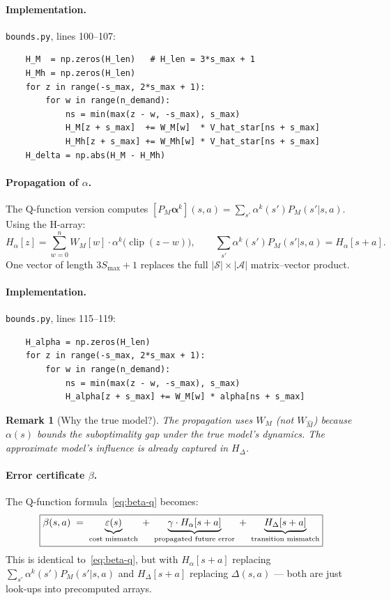\documentclass[11pt]{article}
\newcommand{\Smax}{S_{\max}}
\newcommand{\clip}{\operatorname{clip}}
\newtheorem{remark}{Remark}
\begin{document}
\paragraph{Implementation.}
\texttt{bounds.py}, lines 100--107:
\begin{verbatim}
    H_M  = np.zeros(H_len)   # H_len = 3*s_max + 1
    H_Mh = np.zeros(H_len)
    for z in range(-s_max, 2*s_max + 1):
        for w in range(n_demand):
            ns = min(max(z - w, -s_max), s_max)
            H_M[z + s_max]  += W_M[w]  * V_hat_star[ns + s_max]
            H_Mh[z + s_max] += W_Mh[w] * V_hat_star[ns + s_max]
    H_delta = np.abs(H_M - H_Mh)
\end{verbatim}

\paragraph{Propagation of $\alpha$.}
The Q-function version computes $[P_M \boldsymbol{\alpha}^k](s,a) = \sum_{s'}
\alpha^k(s') P_M(s'|s,a)$.  Using the H-array:
\begin{equation}\label{eq:h-alpha}
  H_\alpha[z] = \sum_{w=0}^{n} W_M[w] \cdot \alpha^k\bigl(\clip(z-w)\bigr),
  \qquad
  \sum_{s'} \alpha^k(s') P_M(s'|s,a) = H_\alpha[s+a].
\end{equation}
One vector of length $3\Smax + 1$ replaces the full $|\mathcal{S}| \times
|\mathcal{A}|$ matrix--vector product.

\paragraph{Implementation.}
\texttt{bounds.py}, lines 115--119:
\begin{verbatim}
    H_alpha = np.zeros(H_len)
    for z in range(-s_max, 2*s_max + 1):
        for w in range(n_demand):
            ns = min(max(z - w, -s_max), s_max)
            H_alpha[z + s_max] += W_M[w] * alpha[ns + s_max]
\end{verbatim}

\begin{remark}[Why the true model?]
The propagation uses $W_M$ (not $W_{\hat M}$) because $\alpha(s)$ bounds the
suboptimality gap under the \emph{true} model's dynamics.  The approximate
model's influence is already captured in $H_\Delta$.
\end{remark}

\paragraph{Error certificate $\beta$.}
The Q-function formula~\eqref{eq:beta-q} becomes:
\begin{equation}\label{eq:beta}
  \boxed{%
  \beta(s, a)
  \;=\; \underbrace{\varepsilon(s)}_{\text{cost mismatch}}
  \;+\; \underbrace{\gamma \cdot H_\alpha[s + a]}_{\text{propagated future error}}
  \;+\; \underbrace{H_\Delta[s + a]}_{\text{transition mismatch}}
  }
\end{equation}
This is identical to~\eqref{eq:beta-q}, but with $H_\alpha[s+a]$ replacing
$\sum_{s'} \alpha^k(s') P_M(s'|s,a)$ and $H_\Delta[s+a]$ replacing
$\Delta(s,a)$ --- both are just look-ups into precomputed arrays.
\end{document}
